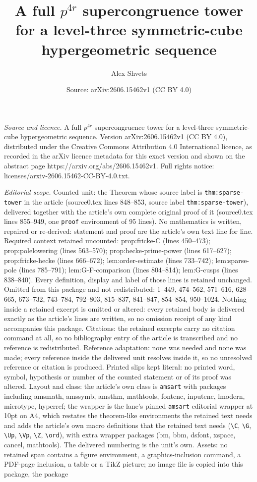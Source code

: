 \documentclass[10pt,a4paper]{amsart}
\title[A full $p^{4r}$ supercongruence tower for a level-three symm]{A full $p^{4r}$ supercongruence tower for a level-three symmetric-cube hypergeometric sequence}
\author{Alex Shvets}
\date{Source: arXiv:2606.15462v1 (CC BY 4.0)}
\begin{document}
\maketitle

\noindent\emph{Source and licence.} A full $p^{4r}$ supercongruence tower for a level-three symmetric-cube hypergeometric sequence. Version arXiv:2606.15462v1 (CC BY 4.0), distributed under the Creative Commons Attribution 4.0 International licence, as recorded in the arXiv licence metadata for this exact version and shown on the abstract page https://arxiv.org/abs/2606.15462v1. Full rights notice: licenses/arxiv-2606.15462-CC-BY-4.0.txt.\par\smallskip

\noindent\textit{Editorial scope.} Counted unit: the Theorem whose source label is \texttt{thm:sparse-tower} in the article (source0.tex lines 848--853, source label \texttt{thm:sparse-tower}), delivered together with the article's own complete original proof of it (source0.tex lines 855--949, one \texttt{proof} environment of 95 lines). No mathematics is written, repaired or re-derived: statement and proof are the article's own text line for line. Required context retained uncounted: prop:fricke-C (lines 450--473); prop:polelowering (lines 563--570); prop:hecke-prime-power (lines 617--627); prop:fricke-hecke (lines 666--672); lem:order-estimate (lines 733--742); lem:sparse-pole (lines 785--791); lem:G-F-comparison (lines 804--814); lem:G-cusps (lines 838--840). Every definition, display and label of those lines is retained unchanged. Omitted from this package and not redistributed: 1--449, 474--562, 571--616, 628--665, 673--732, 743--784, 792--803, 815--837, 841--847, 854--854, 950--1024. Nothing inside a retained excerpt is omitted or altered: every retained body is delivered exactly as the article's lines are written, so no omission receipt of any kind accompanies this package. Citations: the retained excerpts carry no citation command at all, so no bibliography entry of the article is transcribed and no reference is redistributed. Reference adaptation: none was needed and none was made; every reference inside the delivered unit resolves inside it, so no unresolved reference or citation is produced. Printed slips kept literal: no printed word, symbol, hypothesis or number of the counted statement or of its proof was altered. Layout and class: the article's own class is \texttt{amsart} with packages including amsmath, amssymb, amsthm, mathtools, fontenc, inputenc, lmodern, microtype, hyperref; the wrapper is the lane's pinned \texttt{amsart} editorial wrapper at 10pt on A4, which restates the theorem-like environments the retained text needs and adds the article's own macro definitions that the retained text needs (\texttt{\textbackslash C}, \texttt{\textbackslash G}, \texttt{\textbackslash Up}, \texttt{\textbackslash Vp}, \texttt{\textbackslash Z}, \texttt{\textbackslash ord}), with extra wrapper packages (bm, bbm, dsfont, xspace, cancel, mathtools). The delivered numbering is the unit's own. Assets: no retained span contains a figure environment, a graphics-inclusion command, a PDF-page inclusion, a table or a TikZ picture; no image file is copied into this package, the package 
\end{document}
